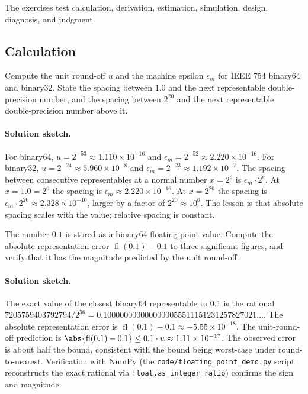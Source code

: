 The exercises test calculation, derivation, estimation,
simulation, design, diagnosis, and judgment.

\subsection*{Calculation}

\begin{exercise}
Compute the unit round-off $u$ and the machine epsilon
$\epsilon_{m}$ for IEEE 754 binary64 and binary32. State the
spacing between $1.0$ and the next representable double-precision
number, and the spacing between $2^{20}$ and the next
representable double-precision number above it.
\end{exercise}

\paragraph{Solution sketch.}
For binary64, $u = 2^{-53} \approx 1.110 \times 10^{-16}$ and
$\epsilon_{m} = 2^{-52} \approx 2.220 \times 10^{-16}$. For binary32,
$u = 2^{-24} \approx 5.960 \times 10^{-8}$ and
$\epsilon_{m} = 2^{-23} \approx 1.192 \times 10^{-7}$. The spacing
between consecutive representables at a normal number $x = 2^{e}$ is
$\epsilon_{m} \cdot 2^{e}$. At $x = 1.0 = 2^{0}$ the spacing is
$\epsilon_{m} \approx 2.220 \times 10^{-16}$. At $x = 2^{20}$ the
spacing is $\epsilon_{m} \cdot 2^{20} \approx 2.328 \times 10^{-10}$,
larger by a factor of $2^{20} \approx 10^{6}$. The lesson is that
absolute spacing scales with the value; relative spacing is
constant.

\begin{exercise}
The number $0.1$ is stored as a binary64 floating-point value.
Compute the absolute representation error $\operatorname{fl}(0.1) - 0.1$ to
three significant figures, and verify that it has the magnitude
predicted by the unit round-off.
\end{exercise}

\paragraph{Solution sketch.}
The exact value of the closest binary64 representable to $0.1$ is
the rational $7205759403792794 / 2^{56}
= 0.1000000000000000055511151231257827021\ldots$. The absolute
representation error is $\operatorname{fl}(0.1) - 0.1
\approx +5.55 \times 10^{-18}$. The unit-round-off prediction is
$\abs{\operatorname{fl}(0.1) - 0.1} \leq 0.1 \cdot u
\approx 1.11 \times 10^{-17}$. The observed error is about half the
bound, consistent with the bound being worst-case under
round-to-nearest. Verification with NumPy (the
\texttt{code/floating\_point\_demo.py} script reconstructs the
exact rational via \texttt{float.as\_integer\_ratio}) confirms the
sign and magnitude.

